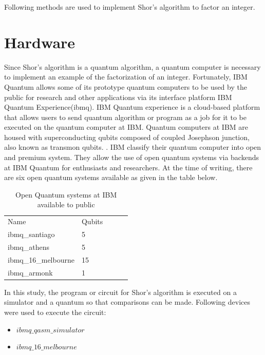 Following methods are used to implement Shor's algorithm to factor an integer.
\section{Hardware}
Since Shor's algorithm is a quantum algorithm, a quantum computer is necessary to implement an example of the factorization of an integer. Fortunately, IBM Quantum allows some of its prototype quantum computers to be used by the public for research and other applications via its interface platform IBM Quantum Experience(ibmq).\cite{devitt2016} IBM Quantum experience is a cloud-based platform that allows users to send quantum algorithm or program as a job for it to be executed on the quantum computer at IBM. Quantum computers at IBM are housed with superconducting qubits composed of coupled Josephson junction, also known as transmon qubits. \cite{fisher_2009}. IBM classify their quantum computer into open and premium system.\cite{ibmq_backends} They allow the use of open quantum systems via backends at IBM Quantum for enthusiasts and researchers. At the time of writing, there are six open quantum systems available as given in the table below.
\begin{table}[h]
\begin{tabular}{|l|l|lll}
\cline{1-2}
Name                & Qubits    \\ \cline{1-2}
ibmq\_santiago      & 5          \\ \cline{1-2}
ibmq\_athens        & 5         \\ \cline{1-2}
ibmq\_16\_melbourne & 15        \\ \cline{1-2}
ibmq\_armonk         & 1        \\ \cline{1-2}

\end{tabular}
 \caption{Open Quantum systems at IBM available to public}
 \label{tab: Open Quantum systems at IBM available to public}
\end{table}

In this study, the program or circuit for Shor's algorithm is executed on a simulator and a quantum so that comparisons can be made. Following devices were used to execute the circuit:\cite{ibmq_backends}
\begin{itemize}
    \item $ibmq\_qasm\_simulator$
    \item $ibmq\_16\_melbourne$
\end{itemize}

